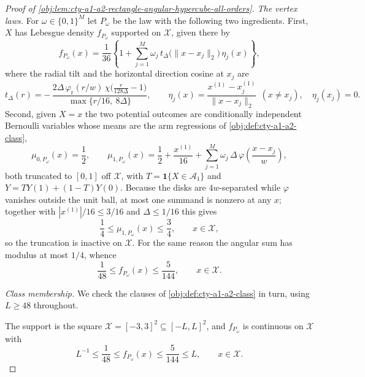 \begin{proof}[Proof of \cref{obj:lem:cty-a1-a2-rectangle-angular-hypercube-all-orders}]
\emph{The vertex laws.}
For \(\omega\in\{0,1\}^M\) let \(P_\omega\) be the law with the following two ingredients.  First, \(X\) has Lebesgue density \(f_{P_\omega}\) supported on \(\mathcal X\), given there by
\[
f_{P_\omega}(x)
=
\frac1{36}
\left\{
1+\sum_{j=1}^{M}\omega_j\,
t_\Delta\bigl(\lVert x-x_j\rVert_2\bigr)\,\eta_j(x)
\right\},
\]
where the radial tilt and the horizontal direction cosine at \(x_j\) are
\[
t_\Delta(r)
=
-\,\frac{2\Delta\,\varphi_{\mathrm r}(r/w)\,
\chi\bigl(\tfrac{r}{128\Delta}-1\bigr)}
{\max\{r/16,\ 8\Delta\}},
\qquad
\eta_j(x)=\frac{x^{(1)}-x_j^{(1)}}{\lVert x-x_j\rVert_2}
\ \ (x\neq x_j),
\quad
\eta_j(x_j)=0 .
\]
Second, given \(X=x\) the two potential outcomes are conditionally independent Bernoulli variables whose means are the arm regressions of \cref{obj:def:cty-a1-a2-class},
\[
\mu_{0,P_\omega}(x)=\frac12,
\qquad
\mu_{1,P_\omega}(x)
=
\frac12+\frac{x^{(1)}}{16}
+\sum_{j=1}^{M}\omega_j\,\Delta\,
\varphi\!\left(\frac{x-x_j}{w}\right),
\]
both truncated to \([0,1]\) off \(\mathcal X\), with \(T=\mathbf 1\{X\in\mathcal A_1\}\) and \(Y=TY(1)+(1-T)Y(0)\).
Because the disks are \(4w\)-separated while \(\varphi\) vanishes outside the unit ball, at most one summand is nonzero at any \(x\); together with \(|x^{(1)}|/16\leq3/16\) and \(\Delta\leq1/16\) this gives
\[
\frac14\leq\mu_{1,P_\omega}(x)\leq\frac34,
\qquad x\in\mathcal X,
\]
so the truncation is inactive on \(\mathcal X\).
For the same reason the angular sum has modulus at most \(1/4\), whence
\[
\frac1{48}\leq f_{P_\omega}(x)\leq\frac5{144},
\qquad x\in\mathcal X.
\]

\emph{Class membership.}
We check the clauses of \cref{obj:def:cty-a1-a2-class} in turn, using \(L\geq48\) throughout.

The support is the square \(\mathcal X=[-3,3]^2\subseteq[-L,L]^2\), and \(f_{P_\omega}\) is continuous on \(\mathcal X\) with
\[
L^{-1}\leq\frac1{48}\leq f_{P_\omega}(x)\leq\frac5{144}\leq L,
\qquad x\in\mathcal X .
\]


\end{proof}
